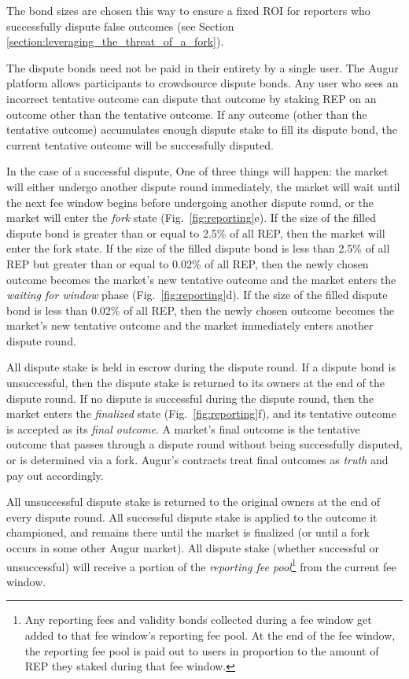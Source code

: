 \documentclass[floatfix,reprint,nofootinbib,amsmath,amssymb,epsfig,pre,floats,letterpaper,groupedaffiliation]{revtex4-1}
\theoremstyle{definition}
\theoremstyle{definition}
\begin{document}
The bond sizes are chosen this way to ensure a fixed ROI for reporters who successfully dispute false outcomes (see Section \ref{section:leveraging_the_threat_of_a_fork}).

The dispute bonds need not be paid in their entirety by a single user.  The Augur platform allows participants to crowdsource dispute bonds.  Any user who sees an incorrect tentative outcome can dispute that outcome by staking REP on an outcome other than the tentative outcome. If any outcome (other than the tentative outcome) accumulates enough dispute stake to fill its dispute bond, the current tentative outcome will be successfully disputed.

In the case of a successful dispute, One of three things will happen: the market will either undergo another dispute round immediately, the market will wait until the next fee window begins before undergoing another dispute round, or the market will enter the \textit{fork} state (Fig.~\ref{fig:reporting}e).  If the size of the filled dispute bond is greater than or equal to 2.5\% of all REP, then the market will enter the fork state. If the size of the filled dispute bond is less than 2.5\% of all REP but greater than or equal to 0.02\% of all REP, then the newly chosen outcome becomes the market's new tentative outcome and the market enters the \textit{waiting for window} phase (Fig.~\ref{fig:reporting}d). If the size of the filled dispute bond is less than 0.02\% of all REP, then the newly chosen outcome becomes the market's new tentative outcome and the market immediately enters another dispute round.

All dispute stake is held in escrow during the dispute round. If a dispute bond is unsuccessful, then the dispute stake is returned to its owners at the end of the dispute round. If no dispute is successful during the dispute round, then the market enters the \textit{finalized} state (Fig.~\ref{fig:reporting}f), and its tentative outcome is accepted as its \textit{final outcome}.  A market's final outcome is the tentative outcome that passes through a dispute round without being successfully disputed, or is determined via a fork.  Augur's contracts treat final outcomes as \textit{truth} and pay out accordingly.

All unsuccessful dispute stake is returned to the original owners at the end of every dispute round.  All successful dispute stake is applied to the outcome it championed, and remains there until the market is finalized (or until a fork occurs in some other Augur market).  All dispute stake (whether successful or unsuccessful) will receive a portion of the \textit{reporting fee pool}\footnote{Any reporting fees and validity bonds collected during a fee window get added to that fee window's reporting fee pool.  At the end of the fee window, the reporting fee pool is paid out to users in proportion to the amount of REP they staked during that fee window.} from the current fee window.
\end{document}
